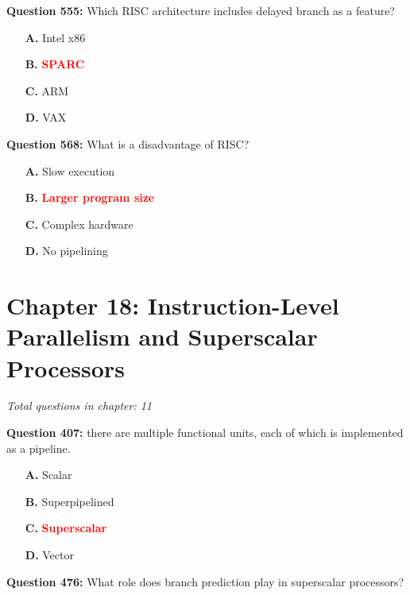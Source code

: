 \documentclass[12pt,a4paper]{article}
\begin{document}
\vspace{0.5cm}

\vspace{0.5cm}



\textbf{Question 555:} Which RISC architecture includes delayed branch as a feature?

\begin{itemize}
    \item[\textbf{A.}] Intel x86
    \item[\textbf{B.}] \textcolor{red}{\textbf{SPARC}}
    \item[\textbf{C.}] ARM
    \item[\textbf{D.}] VAX
\end{itemize}

\textbf{Question 568:} What is a disadvantage of RISC?

\begin{itemize}
    \item[\textbf{A.}] Slow execution
    \item[\textbf{B.}] \textcolor{red}{\textbf{Larger program size}}
    \item[\textbf{C.}] Complex hardware
    \item[\textbf{D.}] No pipelining
\end{itemize}

\section{Chapter 18: Instruction-Level Parallelism and Superscalar Processors}
\textit{Total questions in chapter: 11}

\textbf{Question 407:} \underline{\hspace{1.5cm}} there are multiple functional units, each of which is implemented as a pipeline.

\begin{itemize}
    \item[\textbf{A.}] Scalar
    \item[\textbf{B.}] Superpipelined
    \item[\textbf{C.}] \textcolor{red}{\textbf{Superscalar}}
    \item[\textbf{D.}] Vector
\end{itemize}

\vspace{0.5cm}

\vspace{0.5cm}

\textbf{Question 476:} What role does branch prediction play in superscalar processors?
\end{document}

